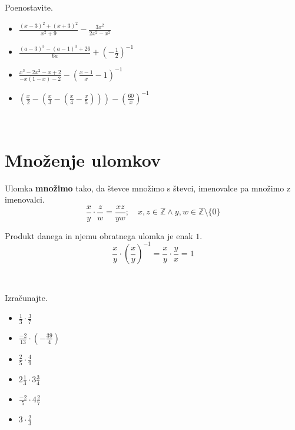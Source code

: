        
            \begin{naloga}
                Poenostavite.
                \begin{itemize}
                    \item $\frac{(x-3)^2+(x+3)^2}{x^2+9}-\frac{3x^2}{2x^2-x^2}$ 
                    \item $\frac{(a-3)^3-(a-1)^3+26}{6a}+\left(-\frac{1}{2}\right)^{-1}$ 
                    \item $\frac{x^3-2x^2-x+2}{-x(1-x)-2}-\left(\frac{x-1}{x}-1\right)^{-1}$ 
                    \item $\left(\frac{x}{2}-\left(\frac{x}{3}-\left(\frac{x}{4}-\frac{x}{5}\right)\right)\right)-\left(\frac{60}{x}\right)^{-1}$ 
                \end{itemize}
            \end{naloga}
        

            ~
        
        \section{Množenje ulomkov}


                Ulomka \textbf{množimo} tako, da števce množimo s števci, imenovalce pa množimo z imenovalci.
                $$\dfrac{x}{y}\cdot \dfrac{z}{w}=\dfrac{xz}{yw}; \quad x,z\in\mathbb{Z}\land y,w\in\mathbb{Z}\setminus\{0\}$$
                
            
                Produkt danega in njemu obratnega ulomka je enak $1$.
                $$\dfrac{x}{y}\cdot\left(\dfrac{x}{y}\right)^{-1}=\dfrac{x}{y}\cdot\dfrac{y}{x}=1$$
            
        
            ~

        
            \begin{naloga}
                Izračunajte.
                \begin{itemize}
                            \item $\frac{1}{3}\cdot \frac{3}{7}$ 
                            \item $\frac{-2}{13}\cdot \left(-\frac{39}{4}\right)$ 
                            \item $\frac{2}{5}\cdot \frac{4}{9}$ 
                            \item $2\frac{1}{3}\cdot 3\frac{3}{4}$ 
                            \item $\frac{-2}{5}\cdot 4\frac{2}{7}$ 
                            \item $3\cdot\frac{2}{3}$ 
                \end{itemize}
            \end{naloga}
        


